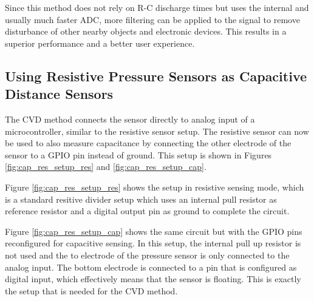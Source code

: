 \documentclass{sigchi}
\begin{document}
Since this method does not rely on R-C discharge times but uses the internal and
usually much faster ADC, more filtering can be applied to the signal to remove
disturbance of other nearby objects and electronic devices. This results in a
superior performance and a better user experience.

\subsection{Using Resistive Pressure Sensors as Capacitive Distance Sensors}
The CVD method connects the sensor directly to analog input of a
microcontroller, similar to the resistive sensor setup. The resistive sensor can
now be used to also measure capacitance by connecting the other electrode of the
sensor to a GPIO pin instead of ground. This setup is shown in Figures
\ref{fig:cap_res_setup_res} and \ref{fig:cap_res_setup_cap}.

Figure \ref{fig:cap_res_setup_res} shows the setup in resistive sensing mode,
which is a standard resitive divider setup which uses an internal pull resistor
as reference resistor and a digital output pin as ground to complete the
circuit.

Figure \ref{fig:cap_res_setup_cap} shows the same circuit but with the GPIO pins
reconfigured for capacitive sensing. In this setup, the internal pull up
resistor is not used and the to electrode of the pressure sensor is only
connected to the analog input. The bottom electrode is connected to a pin that
is configured as digital input, which effectively means that the sensor is
floating. This is exactly the setup that is needed for the CVD method.
\end{document}
